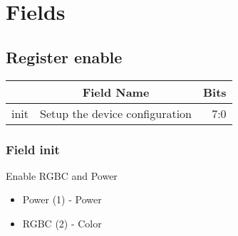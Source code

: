 \documentclass[a4paper,12pt,oneside,pdflatex,italian,final,twocolumn]{article}
\begin{document}
\raggedright

\section{Fields}

 


\raggedright

\subsection{Register enable}
\centering
\begin{tabular}{lcr}
\toprule
  & Field Name & Bits \\
\midrule
init & Setup the device configuration & 
7:0
\\
\bottomrule

\end{tabular}


\raggedright

\subsubsection{Field init }

Enable RGBC and Power

\begin{itemize}
\item Power (1) - Power
\item RGBC (2) - Color
\end{itemize}




\raggedright
\end{document}
